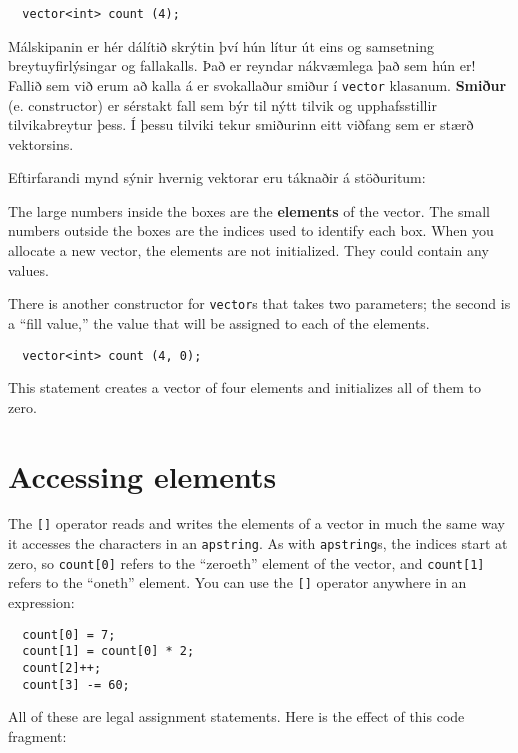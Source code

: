 \begin{verbatim}
  vector<int> count (4);
\end{verbatim}
%
Málskipanin er hér dálítið skrýtin því hún lítur út eins og samsetning breytuyfirlýsingar og fallakalls.
Það er reyndar nákvæmlega það sem hún er!
Fallið sem við erum að kalla á er svokallaður smiður í {\tt vector} klasanum.
{\bf Smiður} (e. constructor) er sérstakt fall sem býr til nýtt tilvik og upphafsstillir tilvikabreytur þess.
Í þessu tilviki tekur smiðurinn eitt viðfang sem er stærð vektorsins.


Eftirfarandi mynd sýnir hvernig vektorar eru táknaðir á stöðuritum:

\vspace{0.1in}
\centerline{}
\vspace{0.1in}

The large numbers inside the boxes are the {\bf elements} of
the vector.  The small numbers outside the boxes are the
indices used to identify each box.  When you allocate a new
vector, the elements are not initialized.  They could contain
any values.

There is another constructor for {\tt vector}s that takes
two parameters; the second is a ``fill value,'' the
value that will be assigned to each of the elements.

\begin{verbatim}
  vector<int> count (4, 0);
\end{verbatim}
%
This statement creates a vector of four elements and initializes
all of them to zero.

\section{Accessing elements}

The {\tt []} operator reads and writes the elements of a vector in
much the same way it accesses the characters in an {\tt apstring}.  As
with {\tt apstring}s, the indices start at zero, so {\tt count[0]}
refers to the ``zeroeth'' element of the vector, and {\tt count[1]}
refers to the ``oneth'' element.  You can use the {\tt []} operator
anywhere in an expression:

\begin{verbatim}
  count[0] = 7;
  count[1] = count[0] * 2;
  count[2]++;
  count[3] -= 60;
\end{verbatim}
%
All of these are legal assignment statements.  Here is the
effect of this code fragment:

